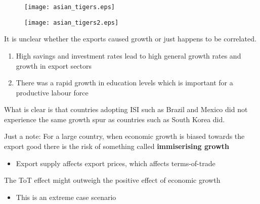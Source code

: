 \documentclass{beamer}
\begin{document}
\begin{frame}
  \begin{figure}
    \texttt{[image: asian\_tigers.eps]}
  \end{figure}
\end{frame}

\begin{frame}
  \begin{figure}
    \texttt{[image: asian\_tigers2.eps]}
  \end{figure}
\end{frame}



\begin{frame}
  It is unclear whether the exports caused growth or just happens to be correlated.
  \begin{enumerate}
    \item High savings and investment rates lead to high general growth rates and growth in export sectors
    \item There was a rapid growth in education levels which is important for a productive labour force
  \end{enumerate}
  \medskip
  What is clear is that countries adopting ISI such as Brazil and Mexico did not experience the same growth spur as countries such as South Korea did.
\end{frame}

\begin{frame}
 Just a note: For a large country, when economic growth is biased towards the export good there is the risk of something called \textbf{immiserising growth}
 \begin{itemize}
   \item Export supply affects export prices, which affects terms-of-trade
 \end{itemize}
 \medskip
 The ToT effect might outweigh the positive effect of economic growth
 \begin{itemize}
   \item This is an extreme case scenario
 \end{itemize}
\end{frame}
\end{document}
